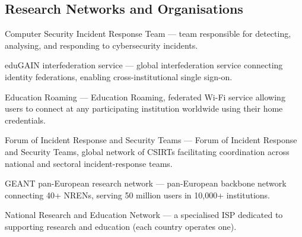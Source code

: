\subsection*{Research Networks and Organisations}

\begin{description}[style=nextline, leftmargin=2.5cm, font=\normalfont\bfseries]
    \item[\glstarget{csirt}CSIRT] Computer Security Incident Response Team --- team responsible for detecting, analysing, and responding to cybersecurity incidents.
    \item[\glstarget{edugain}eduGAIN] eduGAIN interfederation service --- global interfederation service connecting identity federations, enabling cross-institutional single sign-on.
    \item[\glstarget{eduroam}eduroam] Education Roaming --- Education Roaming, federated Wi-Fi service allowing users to connect at any participating institution worldwide using their home credentials.
    \item[\glstarget{first}FIRST] Forum of Incident Response and Security Teams --- Forum of Incident Response and Security Teams, global network of CSIRTs facilitating coordination across national and sectoral incident-response teams.
    \item[\glstarget{geant}GEANT] GEANT pan-European research network --- pan-European backbone network connecting 40+ NRENs, serving 50 million users in 10,000+ institutions.
    \item[\glstarget{nren}NREN] National Research and Education Network --- a specialised ISP dedicated to supporting research and education (each country operates one).
\end{description}

\normalsize

